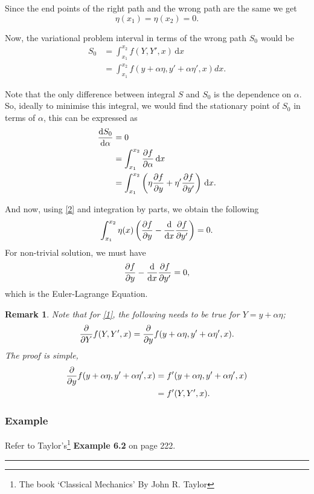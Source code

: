 \documentclass[a4paper]{article}
\newcommand{\dmr}[1]{\, \mathrm{d}#1} %
\newcommand{\intt}[2]{\int_{#1}^{#2}} %
\newtheorem{remark}{Remark}[subsubsection]
\numberwithin{equation}{subsection}
\begin{document}
Since the end points of the right path and the wrong path are the same we get
\begin{equation}
    \eta(x_1) = \eta(x_2) = 0.\label{2}    
\end{equation}

Now, the variational problem interval in terms of the wrong path $S_0$ would be
\begin{align}
    S_0 &= \intt{x_1}{x_2} f(Y,Y',x) \dmr{x} \nonumber \\
    &= \intt{x_1}{x_2} f(y+\alpha \eta, y' + \alpha \eta', x)dx.
\end{align}

Note that the only difference between integral $S$ and $S_0$ is the dependence on $\alpha$. So, ideally to minimise this integral, we would find the stationary point of $S_0$ in terms of $\alpha$, this can be expressed as 
\begin{align}
    \dv{S_0}{\alpha} &= 0 \nonumber \\
    &= \intt{x_1}{x_2} \pdv{f}{\alpha} \dmr{x} \nonumber \\
    &= \intt{x_1}{x_2} \left(\eta \pdv{f}{y} + \eta' \pdv{f}{y'} \right) \dmr{x}.\label{1}
\end{align}

And now, using \eqref{2} and integration by parts, we obtain the following
\begin{equation}
    \intt{x_1}{x_2}\eta(x)\left(\pdv{f}{y}-\dv{x}\pdv{f}{y'}\right) = 0.
\end{equation}
For non-trivial solution, we must have 
\[
    \pdv{f}{y}-\dv{x}\pdv{f}{y'} = 0,
\]
which is the Euler-Lagrange Equation.

\begin{remark}
    Note that for \eqref{1}, the following needs to be true for $Y = y + \alpha \eta$;
    \[
        \pdv{}{Y} f(Y,Y',x) = \pdv{}{y} f(y+\alpha \eta, y'+\alpha \eta', x).
    \]
    The proof is simple,
    \begin{align*}
        \pdv{}{y} f(y+\alpha \eta, y'+\alpha \eta', x) &= f'(y+\alpha \eta, y'+\alpha \eta', x) \\
        &= f'(Y, Y', x).
    \end{align*}
\end{remark}

\subsubsection{Example}
Refer to Taylor's\footnote{The book `Classical Mechanics'\cite{TaylorJohnR.JohnRobert2005Cm} By John R. Taylor} \textbf{Example 6.2} on page 222.
\par\noindent\rule{\textwidth}{0.4pt}
\end{document}
